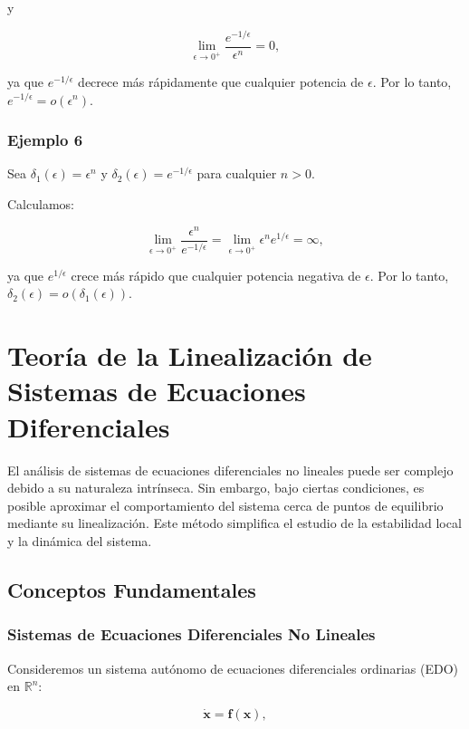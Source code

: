 \documentclass[12pt, a4paper]{report}
\begin{document}
y

\[
\lim_{\epsilon \to 0^+} \frac{e^{-1/\epsilon}}{\epsilon^n} = 0,
\]

ya que \(e^{-1/\epsilon}\) decrece más rápidamente que cualquier potencia de \(\epsilon\). Por lo tanto, \(e^{-1/\epsilon} = o\left( \epsilon^n \right)\).

\subsubsection*{Ejemplo 6}

Sea \(\delta_1(\epsilon) = \epsilon^n\) y \(\delta_2(\epsilon) = e^{-1/\epsilon}\) para cualquier \(n > 0\).

Calculamos:

\[
\lim_{\epsilon \to 0^+} \frac{\epsilon^n}{e^{-1/\epsilon}} = \lim_{\epsilon \to 0^+} \epsilon^n e^{1/\epsilon} = \infty,
\]

ya que \(e^{1/\epsilon}\) crece más rápido que cualquier potencia negativa de \(\epsilon\). Por lo tanto, \(\delta_2(\epsilon) = o\left( \delta_1(\epsilon) \right)\).


\section{Teoría de la Linealización de Sistemas de Ecuaciones Diferenciales}

El análisis de sistemas de ecuaciones diferenciales no lineales puede ser complejo debido a su naturaleza intrínseca. Sin embargo, bajo ciertas condiciones, es posible aproximar el comportamiento del sistema cerca de puntos de equilibrio mediante su linealización. Este método simplifica el estudio de la estabilidad local y la dinámica del sistema.

\subsection{Conceptos Fundamentales}

\subsubsection{Sistemas de Ecuaciones Diferenciales No Lineales}

Consideremos un sistema autónomo de ecuaciones diferenciales ordinarias (EDO) en \(\mathbb{R}^n\):

\begin{equation}\label{eq:sistema_no_lineal}
    \dot{\mathbf{x}} = \mathbf{f}(\mathbf{x}),
\end{equation}
\end{document}
